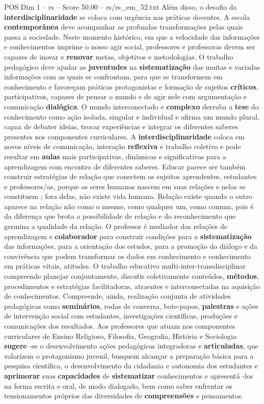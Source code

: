 \begin{textsample}{POS Dim 1 – rs – Score 50.00 – rs/rs\_em\_52.txt}
Além disso, o desafio da \textbf{interdisciplinaridade} se coloca com urgência nas práticas docentes.
A escola \textbf{contemporânea} deve acompanhar as profundas transformações pelas quais passa a sociedade.
Neste momento histórico, em que a velocidade das informações e conhecimentos imprime o nosso agir social, professores e professoras devem ser capazes de inovar e \textbf{renovar} metas, objetivos e metodologias.
O trabalho pedagógico deve ajudar as \textbf{juventudes} na \textbf{sistematização} das muitas e variadas informações com as quais se confrontam, para que se transformem em conhecimento e favoreçam práticas protagonistas e formação de sujeitos \textbf{críticos}, participativos, capazes de pensar o mundo e de agir nele com argumentação e comunicação \textbf{dialógica}.
O mundo interconectado e \textbf{complexo} derruba a \textbf{tese} do conhecimento como ação isolada, singular e individual e afirma um mundo plural, capaz de debater ideias, trocar experiências e integrar os diferentes saberes presentes nos componentes curriculares.
A \textbf{interdisciplinaridade} coloca em novos níveis de comunicação, interação \textbf{reflexiva} e trabalho coletivo e pode resultar em \textbf{aulas} mais participativas, dinâmicas e significativas para a aprendizagem com encontro de diferentes saberes.
Educar parece ser também construir estratégias de relação que conectem os sujeitos aprendentes, estudantes e professores/as, porque os seres humanos nascem em suas relações e nelas se constituem ; fora delas, não existe vida humana.
Relação existe quando o outro aparece na relação não como o mesmo, como qualquer um, como comum, pois é da diferença que brota a possibilidade de relação e do reconhecimento que germina a qualidade da relação.
O professor é mediador das relações de aprendizagem e \textbf{colaborador} para construir condições para a \textbf{sistematização} das informações, para a orientação dos estudos, para a promoção do diálogo e da convivência que podem transformar os dados em conhecimento e conhecimento em práticas vitais, atitudes.
O trabalho educativo multi-inter-transdisciplinar compreende planejar conjuntamente, discutir coletivamente conteúdos, \textbf{métodos}, procedimentos e estratégias facilitadoras, atraentes e interconectadas na aquisição de conhecimentos.
Compreende, ainda, realização conjunta de atividades pedagógicas como \textbf{seminários}, rodas de conversa, bate-papos, \textbf{palestras} e ações de intervenção social com estudantes, investigações científicas, produções e comunicações dos resultados.
Aos professores que atuam nos componentes curriculares de Ensino Religioso, Filosofia, Geografia, História e Sociologia \textbf{sugere} -se o desenvolvimento ações pedagógicas integradoras e \textbf{articuladas}, que valorizem o protagonismo juvenil, busquem alcançar a preparação básica para a pesquisa científica, o desenvolvimento da cidadania e autonomia dos estudantes e \textbf{aprimorar} suas \textbf{capacidades} de \textbf{sistematizar} conhecimentos e apresentá -los na forma escrita e oral, de modo dialogado, bem como saber enfrentar os tensionamentos próprios das diversidades de \textbf{compreensões} e pensamentos.

\end{textsample}
